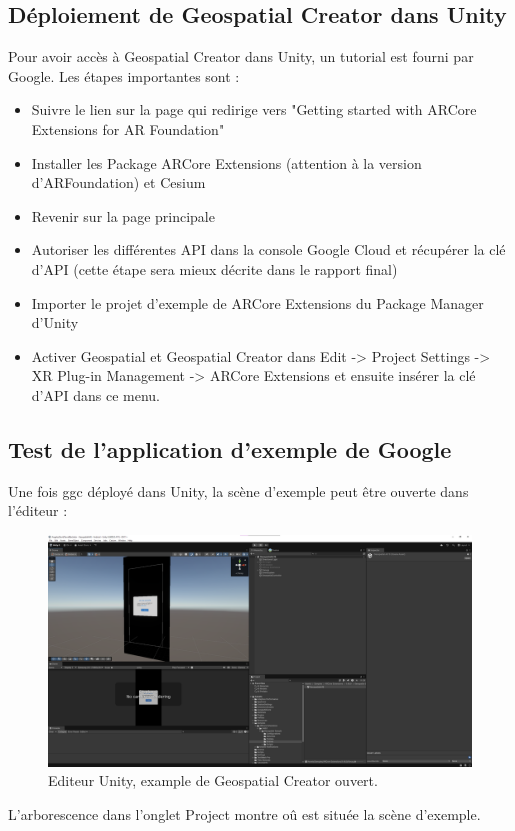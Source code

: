 \subsection{Déploiement de Geospatial Creator dans Unity}
Pour avoir accès à Geospatial Creator dans Unity, un tutorial est fourni par Google\cite{GetStartedGeospatial}. Les étapes importantes sont :
\begin{itemize}[label=\textbullet]
    \item Suivre le lien sur la page qui redirige vers "Getting started with ARCore Extensions for AR Foundation"
    \item Installer les Package ARCore Extensions (attention à la version d'ARFoundation) et Cesium
    \item Revenir sur la page principale
    \item Autoriser les différentes API dans la console Google Cloud et récupérer la clé d'API (cette étape sera mieux décrite dans le rapport final)
    \item Importer le projet d'exemple de ARCore Extensions du Package Manager d'Unity
    \item Activer Geospatial et Geospatial Creator dans Edit -> Project Settings -> XR Plug-in Management -> ARCore Extensions et ensuite insérer la clé d'API dans ce menu.
\end{itemize}
\subsection{Test de l'application d'exemple de Google}
Une fois \acrshort{ggc} déployé dans Unity, la scène d'exemple peut être ouverte dans l'éditeur :
\begin{figure}[H]
    \centering
    \includegraphics[width=1\linewidth]{assets/figures/Screenshots/GGC_1.png}
    \caption{Editeur Unity, example de Geospatial Creator ouvert.}
    \label{fig:GGC_1}
\end{figure}
L'arborescence dans l'onglet Project montre oû est située la scène d'exemple.


